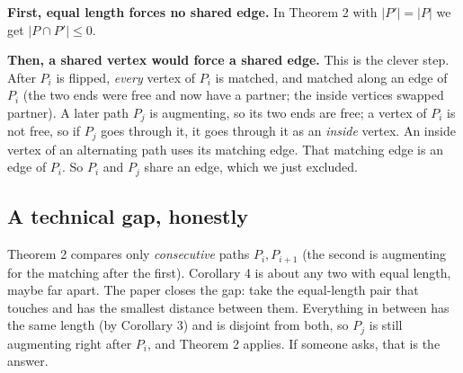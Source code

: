 \documentclass[11pt,a4paper]{article}
\begin{document}
\textbf{First, equal length forces no shared edge.} In Theorem 2 with $|P'|=|P|$ we get $|P\cap P'|\le0$.

\textbf{Then, a shared vertex would force a shared edge.} This is the clever step. After $P_i$ is flipped, \emph{every} vertex of $P_i$ is matched, and matched along an edge of $P_i$ (the two ends were free and now have a partner; the inside vertices swapped partner). A later path $P_j$ is augmenting, so its two ends are free; a vertex of $P_i$ is not free, so if $P_j$ goes through it, it goes through it as an \emph{inside} vertex. An inside vertex of an alternating path uses its matching edge. That matching edge is an edge of $P_i$. So $P_i$ and $P_j$ share an edge, which we just excluded.
\begin{center}
\end{center}

\subsection*{A technical gap, honestly}
Theorem 2 compares only \emph{consecutive} paths $P_i,P_{i+1}$ (the second is augmenting for the matching after the first). Corollary 4 is about any two with equal length, maybe far apart. The paper closes the gap: take the equal-length pair that touches and has the smallest distance between them. Everything in between has the same length (by Corollary 3) and is disjoint from both, so $P_j$ is still augmenting right after $P_i$, and Theorem 2 applies. If someone asks, that is the answer.
\end{document}
